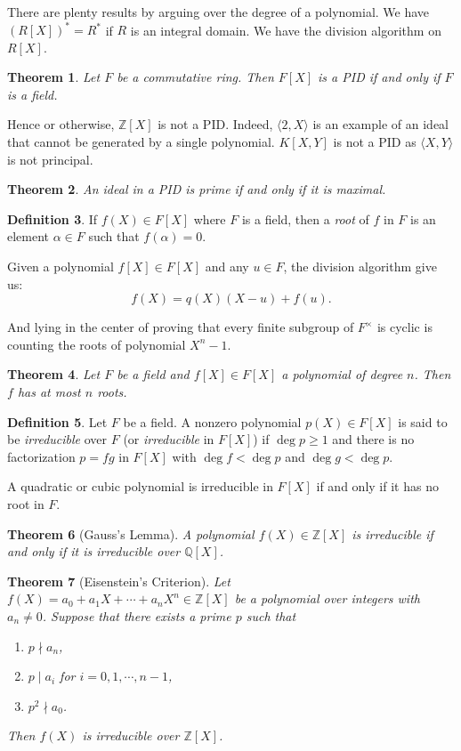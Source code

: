 \documentclass[12pt]{report}
\newtheorem{thm}{Theorem}[section]
\theoremstyle{definition}
\newtheorem{defn}[thm]{Definition}
\def\ZZ{\mathbb{Z}}
\def\QQ{\mathbb{Q}}
\begin{document}
There are plenty results by arguing over the degree of a polynomial. We have $(R[X])^* =  R^*$ if $R$ is an integral domain. We have the division algorithm on $R[X]$.

\begin{thm}
Let $F$ be a commutative ring. Then $F[X]$ is a PID if and only if $F$ is a field.
\end{thm}

Hence or otherwise, $\ZZ[X]$ is not a PID. Indeed, $\langle 2, X\rangle$ is an example of an ideal that cannot be generated by a single polynomial. $K[X,Y]$ is not a PID as $\langle X, Y \rangle$ is not principal.

\begin{thm}
    An ideal in a PID is prime if and only if it is maximal.
\end{thm}

\smallskip

\begin{defn}
    If $f(X)\in F[X]$ where $F$ is a field, then a \emph{root} of $f$ in $F$ is an element $\alpha\in F$ such that $f(\alpha)=0$.
\end{defn}

Given a polynomial $f[X]\in F[X]$ and any $u\in F$, the division algorithm give us: $$f(X)= q(X)(X-u)+f(u).$$

And lying in the center of proving that every finite subgroup of $F^\times$ is cyclic is counting the roots of polynomial $X^n-1$.

\begin{thm}
    Let $F$ be a field and $f[X]\in F[X]$ a polynomial of degree $n$. Then $f$ has at most $n$ roots.
\end{thm}

\begin{defn}
    Let $F$ be a field. A nonzero polynomial $p(X) \in F[X]$ is said to be \emph{irreducible} over $F$ (or \emph{irreducible} in $F[X]$) if $\deg p \geq 1$ and there is no factorization $p=fg$ in $F[X]$ with $\deg f < \deg p$ and $\deg g < \deg p$.
\end{defn}

A quadratic or cubic polynomial is irreducible in $F[X]$ if and only if it has no root in $F$.

\begin{thm}[Gauss's Lemma]
    A polynomial $f(X)\in \ZZ[X]$ is irreducible if and only if it is irreducible over $\QQ[X]$.
\end{thm}

\begin{thm}[Eisenstein's Criterion]
    Let $f(X) = a_0+a_1X+\cdots+a_nX^n\in \ZZ[X]$ be a polynomial over integers with $a_n\not= 0$. Suppose that there exists a prime $p$ such that \begin{enumerate}
        \item  $p\nmid a_n$, 
        \item  $p\mid a_i$  for  $i=0,1,\cdots,n-1$,
        \item  $p^2\nmid a_0$.
    \end{enumerate}
    Then $f(X)$ is irreducible over $\ZZ[X]$.
\end{thm}
\end{document}
